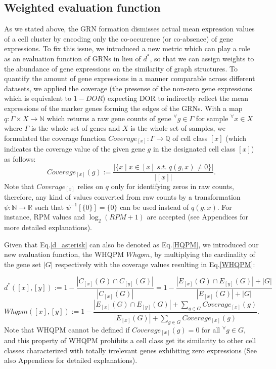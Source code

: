 \documentclass{article}
\begin{document}
\subsection*{Weighted evaluation function}
As we stated above, the GRN formation dismisses actual mean expression values of a cell cluster by encoding only 
the co-occurence (or co-absence) of gene expressions. To fix this issue, we introduced a new metric which can play a 
role as an evaluation function of GRNs in lieu of $d^*$, so that we can assign weights to the abundance of 
gene expressions on the similarity of graph structures. To quantify the amount of gene expressions in a manner 
comparable across different datasets, we applied the coverage (the presense of the non-zero gene expressions which 
is equivalent to $1-DOR$) expecting DOR to indirectly reflect the mean expressions of the marker genes forming 
the edges of the GRNs. With a map $q: \Gamma\times X\rightarrow \mathbb{N}$ which returns a raw gene counts of gene $^\forall g\in\Gamma$ for sample 
$^\forall x\in X$ where $\Gamma$ is the whole set of genes and $X$ is the whole set of samples, we formulated the coverage function 
$Coverage_{[x]}: \Gamma\rightarrow\mathbb{Q}$ of cell class $[x]$ (which indicates the coverage value of the given gene $g$ in the designated cell 
class $[x]$) as follows:
\begin{equation}\label{coverage}
  Coverage_{[x]}(g):=\frac{
    |\{x\;|\;x\in[x]\;s.t.\;q(g,x)\neq 0\}|
  }{
    |[x]|
  }.
\end{equation}
Note that $Coverage_{[x]}$ relies on $q$ only for identifying zeros in raw counts, therefore, 
any kind of values converted from raw counts by a transformation $\psi: \mathbb{N}\rightarrow\mathbb{R}$ 
such that $\psi^{-1}[\{0\}]=\{0\}$ can be used instead of $q(g, x)$. For instance, \ac{RPM} values 
and $\log_2(RPM+1)$ are accepted (see Appendices for more detailed explanations).

Given that Eq.\eqref{d_asterisk} can also be denoted as Eq.\eqref{HQPM}, we introduced our new evaluation function, the \ac{WHQPM} 
$Whqpm$, by multiplying the cardinality of the gene set $|G|$ respectively 
with the coverage values resulting in Eq.\eqref{WHQPM}:

\begin{equation}\label{HQPM}
  d^*([x], [y]) := 1 - \frac{|C_{[x]}(G)\cap C_{[y]}(G)|}{|C_{[x]}(G)|}
  =1 - \frac{
    |E_{[x]}(G)\cap E_{[y]}(G)|+|G|
  }{
    |E_{[x]}(G)|+|G|
  }
\end{equation}
\begin{equation}\label{WHQPM}
  Whqpm([x], [y]) := 1 - \frac{
    |E_{[x]}(G)\cap E_{[y]}(G)|+\sum_{g\in G}Coverage_{[x]}(g)
  }{
    |E_{[x]}(G)|+\sum_{g\in G}Coverage_{[x]}(g)
  }.
\end{equation}
Note that \ac{WHQPM} cannot be defined if $Coverage_{[x]}(g)=0$ for all $^\forall g\in G$, and this property of WHQPM prohibits 
a cell class get its similarity to other cell classes characterized with totally irrelevant genes exhibiting zero expressions 
(See also Appendices for detailed explanations).
\end{document}
